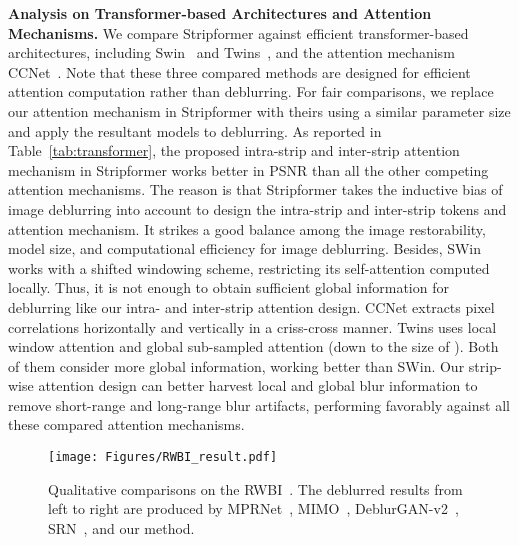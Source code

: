 \noindent\textbf{Analysis on Transformer-based Architectures and Attention Mechanisms.}
We compare Stripformer against efficient transformer-based architectures, including Swin~\cite{liu2021Swin} and Twins~\cite{chu2021Twins}, and the attention mechanism CCNet~\cite{huang2019ccnet}. 
Note that these three compared methods are designed for efficient attention computation rather than deblurring.
For fair comparisons, we replace our attention mechanism in Stripformer with theirs using a similar parameter size and apply the resultant models to deblurring.
As reported in Table~\ref{tab:transformer}, the proposed intra-strip and inter-strip attention mechanism in Stripformer works better in PSNR than all the other competing attention mechanisms. 
The reason is that Stripformer takes the inductive bias of image deblurring into account to design the intra-strip and inter-strip tokens and attention mechanism.
It strikes a good balance among the image restorability, model size, and computational efficiency for image deblurring.
Besides, SWin works with a shifted windowing scheme, restricting its self-attention computed locally. Thus, it is not enough to obtain sufficient global information for deblurring like our intra- and inter-strip attention design. CCNet extracts pixel correlations horizontally and vertically in a criss-cross manner. Twins uses local window attention and global sub-sampled attention (down to the size of ). Both of them consider more global information, working better than SWin. Our strip-wise attention design can better harvest local and global blur information to remove short-range and long-range blur artifacts, performing favorably against all these compared attention mechanisms.

\begin{figure*}[t!]
\centering
\texttt{[image: Figures/RWBI\_result.pdf]}
\caption{Qualitative comparisons on the RWBI~\cite{Zhang_2020_CVPR}. The deblurred results from left to right are produced by MPRNet~\cite{Zamir2021MPRNet}, MIMO~\cite{MIMO}, DeblurGAN-v2~\cite{Kupyn_2019_ICCV}, SRN~\cite{tao2018srndeblur}, and our method.}
\label{fig:Visualization_result_RWBI}
\end{figure*}





